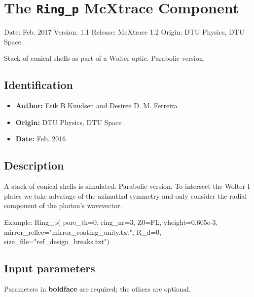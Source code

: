 \section{The \texttt{Ring\_p} McXtrace Component}
Date: Feb. 2017
Version: 1.1
Release: McXtrace 1.2
Origin: DTU Physics, DTU Space

Stack of conical shells as part of a Wolter optic. Parabolic version.

\subsection*{Identification}
\begin{itemize}
  \item \textbf{Author:} Erik B Knudsen and Desiree D. M. Ferreira
  \item \textbf{Origin:} DTU Physics, DTU Space
  \item \textbf{Date:} Feb. 2016
\end{itemize}

\subsection*{Description}
A stack of conical shells is simulated. Parabolic version. To intersect the Wolter I plates we take advatage of the azimuthal symmetry and only consider the radial component of the photon's wavevector.

Example: Ring\_p( pore\_th=0, ring\_nr=3, Z0=FL, yheight=0.605e-3, mirror\_reflec="mirror\_coating\_unity.txt", R\_d=0, size\_file="ref\_design\_breaks.txt")

\subsection*{Input parameters}
Parameters in \textbf{boldface} are required; the others are optional.

